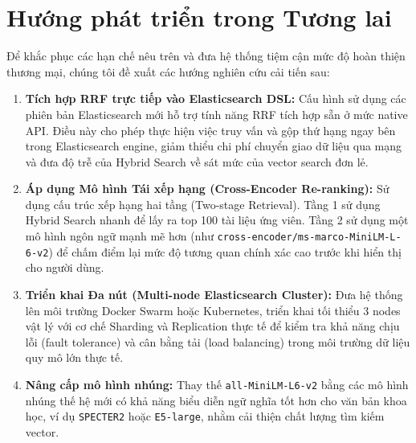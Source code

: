 \section{Hướng phát triển trong Tương lai}
Để khắc phục các hạn chế nêu trên và đưa hệ thống tiệm cận mức độ hoàn thiện thương mại, chúng tôi đề xuất các hướng nghiên cứu cải tiến sau:
\begin{enumerate}
    \item \textbf{Tích hợp RRF trực tiếp vào Elasticsearch DSL:} Cấu hình sử dụng các phiên bản Elasticsearch mới hỗ trợ tính năng RRF tích hợp sẵn ở mức native API. Điều này cho phép thực hiện việc truy vấn và gộp thứ hạng ngay bên trong Elasticsearch engine, giảm thiểu chi phí chuyển giao dữ liệu qua mạng và đưa độ trễ của Hybrid Search về sát mức của vector search đơn lẻ.
    \item \textbf{Áp dụng Mô hình Tái xếp hạng (Cross-Encoder Re-ranking):} Sử dụng cấu trúc xếp hạng hai tầng (Two-stage Retrieval). Tầng 1 sử dụng Hybrid Search nhanh để lấy ra top 100 tài liệu ứng viên. Tầng 2 sử dụng một mô hình ngôn ngữ mạnh mẽ hơn (như \texttt{cross-encoder/ms-marco-MiniLM-L-6-v2}) để chấm điểm lại mức độ tương quan chính xác cao trước khi hiển thị cho người dùng.
    \item \textbf{Triển khai Đa nút (Multi-node Elasticsearch Cluster):} Đưa hệ thống lên môi trường Docker Swarm hoặc Kubernetes, triển khai tối thiểu 3 nodes vật lý với cơ chế Sharding và Replication thực tế để kiểm tra khả năng chịu lỗi (fault tolerance) và cân bằng tải (load balancing) trong môi trường dữ liệu quy mô lớn thực tế.
    \item \textbf{Nâng cấp mô hình nhúng:} Thay thế \texttt{all-MiniLM-L6-v2} bằng các mô hình nhúng thế hệ mới có khả năng biểu diễn ngữ nghĩa tốt hơn cho văn bản khoa học, ví dụ \texttt{SPECTER2} hoặc \texttt{E5-large}, nhằm cải thiện chất lượng tìm kiếm vector.
\end{enumerate}
